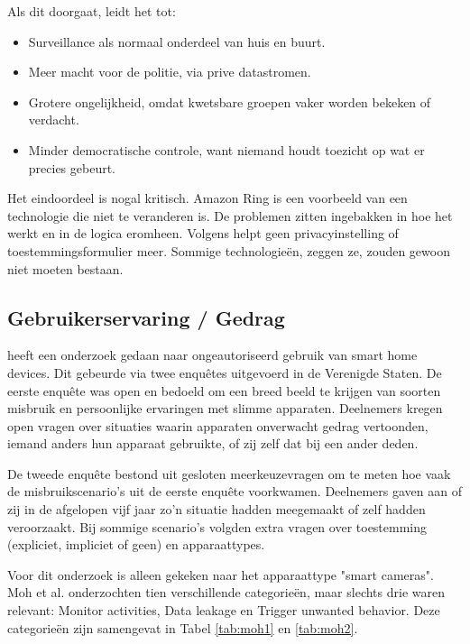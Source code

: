 \documentclass[nonacm, sigconf]{acmart}
\begin{document}
    \noindent Als dit doorgaat, leidt het tot:
    \begin{itemize}
        \item Surveillance als normaal onderdeel van huis en buurt.
        \item Meer macht voor de politie, via prive datastromen.
        \item Grotere ongelijkheid, omdat kwetsbare groepen vaker worden bekeken of verdacht.
        \item Minder democratische controle, want niemand houdt toezicht op wat er precies gebeurt.
    \end{itemize}

    \noindent Het eindoordeel is nogal kritisch.
    Amazon Ring is een voorbeeld van een technologie die niet te veranderen is.
    De problemen zitten ingebakken in hoe het werkt en in de logica eromheen.
    Volgens \citeauthor{selinger2022amazon} helpt geen privacyinstelling of toestemmingsformulier meer.
    Sommige technologieën, zeggen ze, zouden gewoon niet moeten bestaan.

    \subsection{Gebruikerservaring / Gedrag}


    \parencite{moh2023characterizing} heeft een onderzoek gedaan naar ongeautoriseerd gebruik van smart home devices.
    Dit gebeurde via twee enquêtes uitgevoerd in de Verenigde Staten.
    De eerste enquête was open en bedoeld om een breed beeld te krijgen van soorten misbruik en persoonlijke ervaringen met slimme apparaten.
    Deelnemers kregen open vragen over situaties waarin apparaten onverwacht gedrag vertoonden, iemand anders hun apparaat gebruikte, of zij zelf dat bij een ander deden.

    De tweede enquête bestond uit gesloten meerkeuzevragen om te meten hoe vaak de misbruikscenario's uit de eerste enquête voorkwamen.
    Deelnemers gaven aan of zij in de afgelopen vijf jaar zo'n situatie hadden meegemaakt of zelf hadden veroorzaakt.
    Bij sommige scenario's volgden extra vragen over toestemming (expliciet, impliciet of geen) en apparaattypes.

    Voor dit onderzoek is alleen gekeken naar het apparaattype "smart cameras".
    Moh et al. onderzochten tien verschillende categorieën, maar slechts drie waren relevant: Monitor activities, Data leakage en Trigger unwanted behavior.
    Deze categorieën zijn samengevat in Tabel \ref{tab:moh1} en \ref{tab:moh2}.
\end{document}
